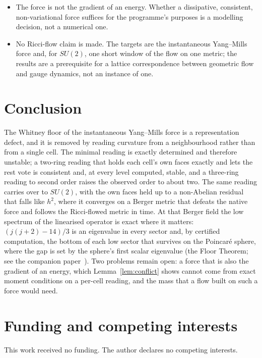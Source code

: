 \documentclass[11pt]{article}
\theoremstyle{definition}
\theoremstyle{remark}
\begin{document}
\begin{itemize}
    refinement are only moderately above the threshold. The hybrid reading
    (Section~\ref{sec:hybrid}) gives $1.88$ and $1.83$ on the same meshes, but it is
    Abelian only, and its order exceeds what the bound~\eqref{eq:pgbound} explains.
  \item The force is not the gradient of an energy. Whether a dissipative, consistent,
    non-variational force suffices for the programme's purposes is a modelling decision,
    not a numerical one.
  \item No Ricci-flow claim is made. The targets are the instantaneous Yang--Mills force
    and, for $SU(2)$, one short window of the flow on one metric; the results are a
    prerequisite for a lattice correspondence between geometric flow and gauge dynamics, not an
    instance of one.
\end{itemize}

\section{Conclusion}\label{sec:conclusion}

The Whitney floor of the instantaneous Yang--Mills force is a representation defect, and it is
removed by reading curvature from a neighbourhood rather than from a single cell. The minimal reading
is exactly determined and therefore unstable; a two-ring reading that holds each cell's own faces
exactly and lets the rest vote is consistent and, at every level computed, stable, and a three-ring
reading to second order raises the observed order to about two. The same reading carries over to
$SU(2)$, with the own faces held up to a non-Abelian residual that falls like $h^2$, where it
converges on a Berger metric that defeats the native force and follows the
Ricci-flowed metric in time. At that Berger field the low spectrum of the linearised operator is
exact where it matters: $(j(j+2)-14)/3$ is an eigenvalue in every sector and, by certified computation,
the bottom of each low sector that survives on the Poincar\'e sphere, where the gap is set by the
sphere's first scalar eigenvalue (the Floor Theorem; see the companion paper~\cite{davisberger}).
Two problems remain open: a
force that is also the gradient of an energy, which Lemma~\ref{lem:conflict} shows cannot come from
exact moment conditions on a per-cell reading, and the mass that a flow built on such a force would
need.

\section*{Funding and competing interests}
This work received no funding. The author declares no competing interests.
\end{document}
